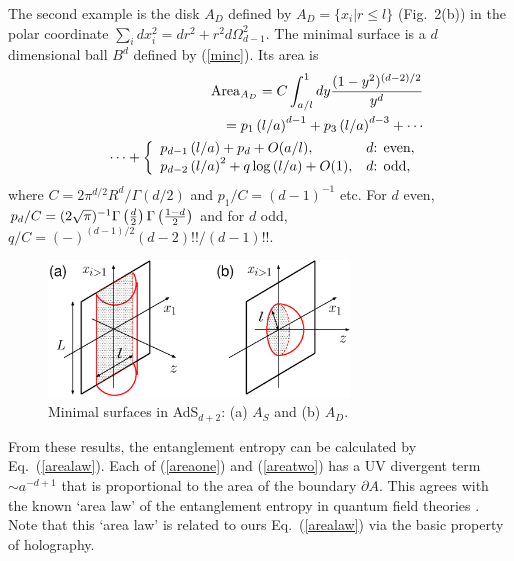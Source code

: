 \documentclass[amsmath,amssymb,nofootinbib,eqsecnum,tighten,prd,12pt]{revtex4}
\def\frac#1#2{{#1\over #2}}
\def\s{\sqrt}
\def\de{\partial}
\def\f {\frac}
\def\frac#1#2{{#1\over #2}}
\def\s{\sqrt}
\begin{document}
The second example
is the disk $A_{D}$ defined by $A_{D}=\{x_i|r\leq l\}$ (Fig.\ 2(b))
in the polar coordinate $\sum_{i}dx_i^2=dr^2+r^2d\Omega_{d-1}^2$.
The minimal surface is a $d$ dimensional ball $B^d$ defined by
(\ref{minc}). Its area is
\begin{eqnarray}
&&{\rm Area}_{A_{D}}
=
C
\int^1_{a/l}dy \f{(1-y^2)^{(d-2)/2}}{y^d}  \nonumber \\
&&=
  p_1  \left(l/a\right)^{d-1}
+ p_3 \left(l/a \right)^{d-3}
+\cdots  \label{areatwo}  \\
&&
\cdots
+\left\{
\begin{array}{ll}
\displaystyle
p_{d-1}\left(l/a\right)
+
p_d
+
O(a/l), &
 \mbox{$d$: even},   \\
\displaystyle
p_{d-2} \left(l/a\right)^{2}
+ q \log \left(l/a\right)+ O(1),
&  \mbox{$d$: odd,}   \\
\end{array}
\right.
 \nonumber
\end{eqnarray}
where $C=2\pi^{d/2}R^d/ \Gamma(d/2)$ and
$p_1/C = (d-1)^{-1}$ etc.
For $d$ even,
$p_d/C = (2\s{\pi})^{-1}\Gamma\left(\f{d}{2}\right)
\Gamma\left(\f{1-d}{2}\right)$
and for $d$ odd,
$q/C = (-)^{(d-1)/2}(d-2)!!/(d-1)!!$.


\begin{figure}
\begin{center}
\includegraphics[width=8cm,clip]{min_surfs.eps}
\end{center}
\caption{
\label{fig: min_surf}
Minimal surfaces in
AdS$_{d+2}$: (a) $A_S$
and (b) $A_D$.
}
\end{figure}


{}From these results, the entanglement entropy can be calculated by
Eq.\ (\ref{arealaw}). Each of (\ref{areaone}) and (\ref{areatwo})
has a UV divergent term $\sim a^{-d+1}$ that is proportional to the
area of the boundary $\de A$. This agrees with the known `area law'
of the entanglement entropy in quantum field theories
\cite{Bombelli,Srednicki}. Note that this `area law' is related to
ours Eq.\ (\ref{arealaw})  via the basic property of holography.
\end{document}
